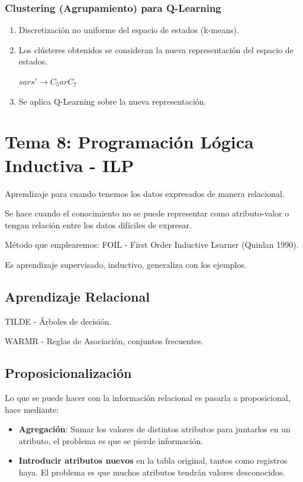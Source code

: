 \documentclass[12pt, twoside, openright]{report} %
\begin{document}
\subsection{Clustering (Agrupamiento) para Q-Learning}
\begin{enumerate}
  \item Discretización no uniforme del espacio de estados (k-means).
  \item Los clústeres obtenidos se consideran la nueva representación del espacio de estados.
  
  $sars' \rightarrow C_5arC_7$
  \item Se aplica Q-Learning sobre la nueva representación.
\end{enumerate}

\chapter{Tema 8: Programación Lógica Inductiva - ILP}
Aprendizaje para cuando tenemos los datos expresados de manera relacional.

Se hace cuando el conocimiento no se puede representar como atributo-valor o tengan relación entre los datos difíciles de expresar.

Método que emplearemos: FOIL - First Order Inductive Learner (Quinlan 1990).

Es aprendizaje supervisado, inductivo, generaliza con los ejemplos.

\section{Aprendizaje Relacional}
TILDE - Árboles de decisión.

WARMR - Reglas de Asociación, conjuntos frecuentes.

\section{Proposicionalización}
Lo que se puede hacer con la información relacional es pasarla a proposicional, hace mediante:
\begin{itemize}
  \item \textbf{Agregación}: Sumar los valores de distintos atributos para juntarlos en un atributo, el problema es que se pierde información.
  \item \textbf{Introducir atributos nuevos} en la tabla original, tantos como registros haya. El problema es que muchos atributos tendrán valores desconocidos.
\end{itemize}
\end{document}
